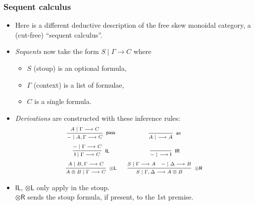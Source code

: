\documentclass[10pt,t]{beamer}
\newcommand{\I}{\mathsf{I}}
\newcommand{\ot}{\otimes}
\newcommand{\n}{{-}}
\newcommand{\ax}{\mathsf{ax}}
\newcommand{\uf}{\mathsf{pass}}
\newcommand{\IL}{\I\mathsf{L}}
\newcommand{\otL}{\ot\mathsf{L}}
\newcommand{\IR}{\I\mathsf{R}}
\newcommand{\otR}{\ot\mathsf{R}}
\newcommand{\scut}{\mathsf{scut}}
\newcommand{\ccut}{\mathsf{ccut}}
\renewcommand{\vdash}{\longrightarrow}
\begin{document}
\begin{frame}

\frametitle{Sequent calculus}

\begin{itemize}

\item Here is a different deductive description of the free skew
  monoidal category, a (cut-free) ``sequent calculus''.

\item \emph{Sequents} now take the form $S \mid \Gamma \vdash C$
  where
\begin{itemize}
\item $S$ (stoup) is an optional formula,
\item $\Gamma$ (context) is a list of formulae,
\item $C$ is a single formula.
\end{itemize}

\item \emph{Derivations} are constructed with these inference rules:
\[
\scriptsize
\begin{array}{c@{\quad \quad}c}
\infer[\uf]{\n \mid A, \Gamma \vdash C}{
  A \mid \Gamma \vdash C
}
&
\infer[\ax]{A \mid ~\vdash A}{
}
\\[6pt]
\infer[\IL]{\I \mid \Gamma \vdash C}{
  \n \mid \Gamma \vdash C
}
&
\infer[\IR]{\n \mid ~ \vdash \I}{
}
\\[6pt]
\infer[\otL]{A \ot B \mid \Gamma \vdash C}{
  A \mid B, \Gamma \vdash C
}
&
\infer[\otR]{S \mid \Gamma, \Delta \vdash A \otimes B}{
  S \mid \Gamma \vdash A
  &
  \n \mid \Delta \vdash B
}
\end{array}
\]

\item $\IL$, $\otL$ only apply in the stoup. \\ 
 $\otR$ sends the stoup formula, if present, to the
  1st premise.


\end{itemize}


\end{frame}

\end{document}
